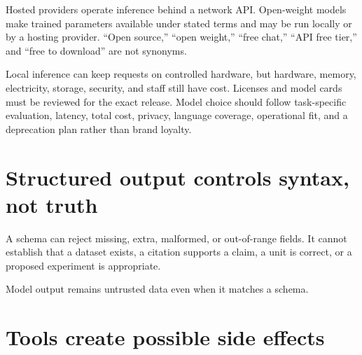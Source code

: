Hosted providers operate inference behind a network API. Open-weight models
make trained parameters available under stated terms and may be run locally or
by a hosting provider. ``Open source,'' ``open weight,'' ``free chat,'' ``API
free tier,'' and ``free to download'' are not synonyms.

Local inference can keep requests on controlled hardware, but hardware, memory,
electricity, storage, security, and staff still have cost. Licenses and model
cards must be reviewed for the exact release. Model choice should follow
task-specific evaluation, latency, total cost, privacy, language coverage,
operational fit, and a deprecation plan rather than brand loyalty.

\section{Structured output controls syntax, not truth}

A schema can reject missing, extra, malformed, or out-of-range fields. It cannot
establish that a dataset exists, a citation supports a claim, a unit is correct,
or a proposed experiment is appropriate.

\begin{center}
\end{center}

Model output remains untrusted data even when it matches a schema.

\section{Tools create possible side effects}

